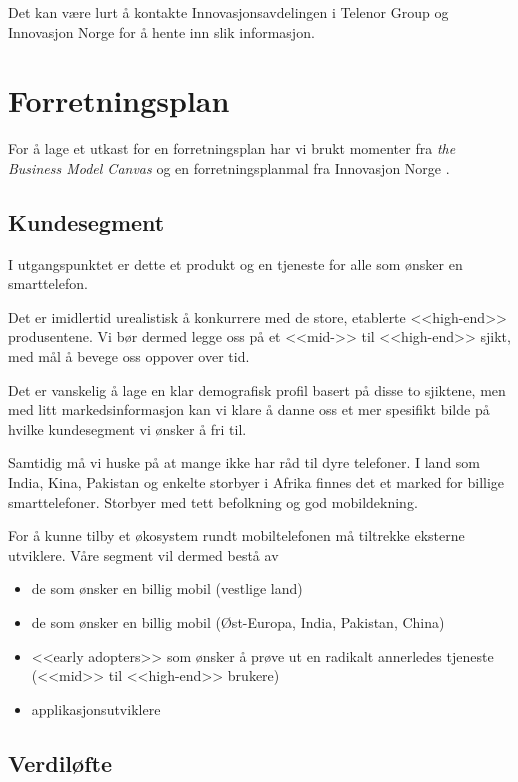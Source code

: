 Det kan være lurt å kontakte Innovasjonsavdelingen i Telenor Group og
Innovasjon Norge for å hente inn slik informasjon.

\section{Forretningsplan}

For å lage et utkast for en forretningsplan har vi brukt momenter fra
\textit{the Business Model Canvas} \cite{osterwalder} og en forretningsplanmal
fra Innovasjon Norge \cite{innovasjon.norge}. 

\subsection*{Kundesegment}

I utgangspunktet er dette et produkt og en tjeneste for alle som ønsker en
smarttelefon.

Det er imidlertid urealistisk å konkurrere med de store, etablerte <<high-end>>
produsentene.  Vi bør dermed legge oss på et <<mid->> til <<high-end>> sjikt,
med mål å bevege oss oppover over tid.

Det er vanskelig å lage en klar demografisk profil basert på disse to
sjiktene, men med litt markedsinformasjon kan vi klare å danne oss et mer
spesifikt bilde på hvilke kundesegment vi ønsker å fri til.

Samtidig må vi huske på at mange ikke har råd til dyre telefoner. I land som
India, Kina, Pakistan og enkelte storbyer i Afrika finnes det et marked for
billige smarttelefoner. Storbyer med tett befolkning og god mobildekning.

For å kunne tilby et økosystem rundt mobiltelefonen må tiltrekke eksterne
utviklere.  Våre segment vil dermed bestå av
%
\begin{itemize}
  \item de som ønsker en billig mobil (vestlige land)
  \item de som ønsker en billig mobil (Øst-Europa, India, Pakistan, China)
  \item <<early adopters>> som ønsker å prøve ut en radikalt annerledes
    tjeneste (<<mid>> til <<high-end>> brukere)
  \item applikasjonsutviklere
\end{itemize}

\subsection*{Verdiløfte}

